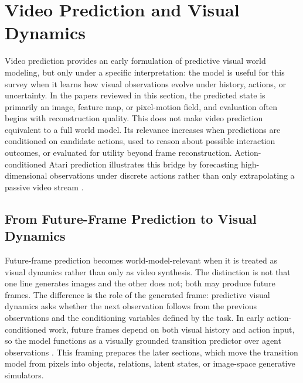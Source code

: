 \section{Video Prediction and Visual Dynamics}
\label{sec:video_prediction}

Video prediction provides an early formulation of predictive visual world modeling, but only under a specific interpretation: the model is useful for this survey when it learns how visual observations evolve under history, actions, or uncertainty. In the papers reviewed in this section, the predicted state is primarily an image, feature map, or pixel-motion field, and evaluation often begins with reconstruction quality. This does not make video prediction equivalent to a full world model. Its relevance increases when predictions are conditioned on candidate actions, used to reason about possible interaction outcomes, or evaluated for utility beyond frame reconstruction. Action-conditioned Atari prediction illustrates this bridge by forecasting high-dimensional observations under discrete actions rather than only extrapolating a passive video stream \cite{oh2015_action_conditional_video_prediction_prov}.

\subsection{From Future-Frame Prediction to Visual Dynamics}

Future-frame prediction becomes world-model-relevant when it is treated as visual dynamics rather than only as video synthesis. The distinction is not that one line generates images and the other does not; both may produce future frames. The difference is the role of the generated frame: predictive visual dynamics asks whether the next observation follows from the previous observations and the conditioning variables defined by the task. In early action-conditioned work, future frames depend on both visual history and action input, so the model functions as a visually grounded transition predictor over agent observations \cite{oh2015_action_conditional_video_prediction_prov}. This framing prepares the later sections, which move the transition model from pixels into objects, relations, latent states, or image-space generative simulators.

